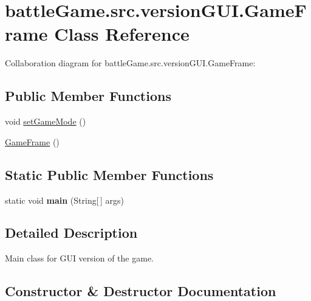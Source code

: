\hypertarget{classbattleGame_1_1src_1_1versionGUI_1_1GameFrame}{}\section{battle\+Game.\+src.\+version\+G\+U\+I.\+Game\+Frame Class Reference}
\label{classbattleGame_1_1src_1_1versionGUI_1_1GameFrame}


Collaboration diagram for battle\+Game.\+src.\+version\+G\+U\+I.\+Game\+Frame\+:
\subsection*{Public Member Functions}
\begin{DoxyCompactItemize}
\item 
void \hyperlink{classbattleGame_1_1src_1_1versionGUI_1_1GameFrame_af3f75cdb23ae814bfc1754128febb4e2}{set\+Game\+Mode} ()
\item 
\hyperlink{classbattleGame_1_1src_1_1versionGUI_1_1GameFrame_acc1968c0b85114220caa7d673d17dc4f}{Game\+Frame} ()
\end{DoxyCompactItemize}
\subsection*{Static Public Member Functions}
\begin{DoxyCompactItemize}
\item 
static void {\bfseries main} (String\mbox{[}$\,$\mbox{]} args)\hypertarget{classbattleGame_1_1src_1_1versionGUI_1_1GameFrame_af621ffdc168bf0829600ee15ca4130e4}{}\label{classbattleGame_1_1src_1_1versionGUI_1_1GameFrame_af621ffdc168bf0829600ee15ca4130e4}

\end{DoxyCompactItemize}


\subsection{Detailed Description}
Main class for G\+UI version of the game. 

\subsection{Constructor \& Destructor Documentation}

